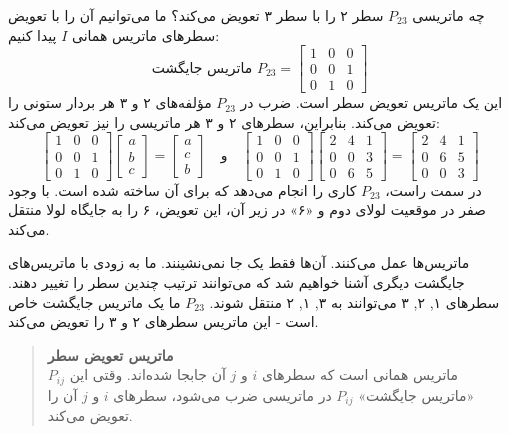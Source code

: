 \documentclass[12pt, a4paper]{book}
\begin{document}
	چه ماتریسی $P_{23}$ سطر ۲ را با سطر ۳ تعویض می‌کند؟ ما می‌توانیم آن را با تعویض سطرهای ماتریس همانی $I$ پیدا کنیم:
	\[
	\text{ماتریس جایگشت } P_{23} = \begin{bmatrix} 1 & 0 & 0 \\ 0 & 0 & 1 \\ 0 & 1 & 0 \end{bmatrix}
	\]
	این یک ماتریس تعویض سطر است. ضرب در $P_{23}$ مؤلفه‌های ۲ و ۳ هر بردار ستونی را تعویض می‌کند. بنابراین، سطرهای ۲ و ۳ هر ماتریسی را نیز تعویض می‌کند:
	\[
	\begin{bmatrix} 1 & 0 & 0 \\ 0 & 0 & 1 \\ 0 & 1 & 0 \end{bmatrix}
	\begin{bmatrix} a \\ b \\ c \end{bmatrix}
	=
	\begin{bmatrix} a \\ c \\ b \end{bmatrix}
	\quad \text{و} \quad
	\begin{bmatrix} 1 & 0 & 0 \\ 0 & 0 & 1 \\ 0 & 1 & 0 \end{bmatrix}
	\begin{bmatrix} 2 & 4 & 1 \\ 0 & 0 & 3 \\ 0 & 6 & 5 \end{bmatrix}
	=
	\begin{bmatrix} 2 & 4 & 1 \\ 0 & 6 & 5 \\ 0 & 0 & 3 \end{bmatrix}
	\]
	در سمت راست، $P_{23}$ کاری را انجام می‌دهد که برای آن ساخته شده است. با وجود صفر در موقعیت لولای دوم و «۶» در زیر آن، این تعویض، ۶ را به جایگاه لولا منتقل می‌کند.
	
	ماتریس‌ها عمل می‌کنند. آن‌ها فقط یک جا نمی‌نشینند. ما به زودی با ماتریس‌های جایگشت دیگری آشنا خواهیم شد که می‌توانند ترتیب چندین سطر را تغییر دهند. سطرهای ۱, ۲, ۳ می‌توانند به ۳, ۱, ۲ منتقل شوند. $P_{23}$ ما یک ماتریس جایگشت خاص است - این ماتریس سطرهای ۲ و ۳ را تعویض می‌کند.
	
	\begin{quote}
		\textbf{ماتریس تعویض سطر} \\
		$P_{ij}$ ماتریس همانی است که سطرهای $i$ و $j$ آن جابجا شده‌اند.
		وقتی این «ماتریس جایگشت» $P_{ij}$ در ماتریسی ضرب می‌شود، سطرهای $i$ و $j$ آن را تعویض می‌کند.
	\end{quote}
	
\end{document}
